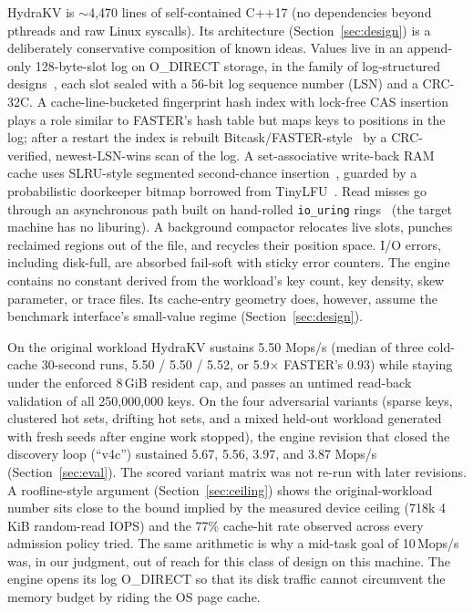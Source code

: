 \documentclass{article}
\newcommand{\FASTERBase}{0.93}          %
\newcommand{\SpeedupFinal}{5.9$\times$}
\newcommand{\HydraSparse}{5.67}
\newcommand{\HydraClustered}{5.56}
\newcommand{\HydraDrift}{3.97}
\newcommand{\HydraHoldout}{3.87}
\newcommand{\HydraFinalWL}{5.50}        %
\newcommand{\HydraFinalWLRuns}{5.50 / 5.50 / 5.52}
\newcommand{\EngineLocFinal}{$\sim$4{,}470}
\newcommand{\NKeys}{250{,}000{,}000}
\newcommand{\MemBudget}{8\,GiB}
\newcommand{\FioIops}{718k}
\newcommand{\HitRate}{77\%}
\begin{document}
HydraKV is \EngineLocFinal{} lines of self-contained C++17 (no dependencies beyond pthreads and raw Linux syscalls). Its architecture (Section~\ref{sec:design}) is a deliberately conservative composition of known ideas. Values live in an append-only 128-byte-slot log on O\_DIRECT storage, in the family of log-structured designs~\cite{lsm,faster}, each slot sealed with a 56-bit log sequence number (LSN) and a CRC-32C. A cache-line-bucketed fingerprint hash index with lock-free CAS insertion plays a role similar to FASTER's hash table but maps keys to positions in the log; after a restart the index is rebuilt Bitcask/FASTER-style~\cite{bitcask,faster} by a CRC-verified, newest-LSN-wins scan of the log. A set-associative write-back RAM cache uses SLRU-style segmented second-chance insertion~\cite{slru}, guarded by a probabilistic doorkeeper bitmap borrowed from TinyLFU~\cite{tinylfu}. Read misses go through an asynchronous path built on hand-rolled \texttt{io\_uring} rings~\cite{iouring} (the target machine has no liburing). A background compactor relocates live slots, punches reclaimed regions out of the file, and recycles their position space. I/O errors, including disk-full, are absorbed fail-soft with sticky error counters. The engine contains no constant derived from the workload's key count, key density, skew parameter, or trace files. Its cache-entry geometry does, however, assume the benchmark interface's small-value regime (Section~\ref{sec:design}).

On the original workload HydraKV sustains \HydraFinalWL{} Mops/s (median of three cold-cache 30-second runs, \HydraFinalWLRuns, or \SpeedupFinal{} FASTER's \FASTERBase) while staying under the enforced \MemBudget{} resident cap, and passes an untimed read-back validation of all \NKeys{} keys. On the four adversarial variants (sparse keys, clustered hot sets, drifting hot sets, and a mixed held-out workload generated with fresh seeds after engine work stopped), the engine revision that closed the discovery loop (``v4c'') sustained \HydraSparse, \HydraClustered, \HydraDrift, and \HydraHoldout{} Mops/s (Section~\ref{sec:eval}). The scored variant matrix was not re-run with later revisions. A roofline-style argument (Section~\ref{sec:ceiling}) shows the original-workload number sits close to the bound implied by the measured device ceiling (\FioIops{} 4\,KiB random-read IOPS) and the \HitRate{} cache-hit rate observed across every admission policy tried. The same arithmetic is why a mid-task goal of 10\,Mops/s was, in our judgment, out of reach for this class of design on this machine. The engine opens its log O\_DIRECT so that its disk traffic cannot circumvent the memory budget by riding the OS page cache.
\end{document}
